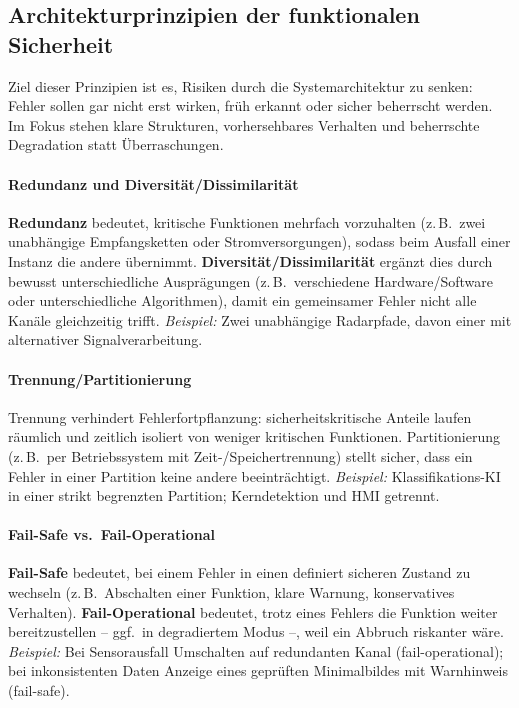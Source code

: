 \subsection{Architekturprinzipien der funktionalen Sicherheit}
Ziel dieser Prinzipien ist es, Risiken durch die Systemarchitektur zu senken: Fehler sollen gar nicht erst wirken, früh erkannt oder sicher beherrscht werden. Im Fokus stehen klare Strukturen, vorhersehbares Verhalten und beherrschte Degradation statt Überraschungen.

\paragraph{Redundanz und Diversität/Dissimilarität}
\textbf{Redundanz} bedeutet, kritische Funktionen mehrfach vorzuhalten (z.\,B.\ zwei unabhängige Empfangsketten oder Stromversorgungen), sodass beim Ausfall einer Instanz die andere übernimmt.
\textbf{Diversität/Dissimilarität} ergänzt dies durch bewusst unterschiedliche Ausprägungen (z.\,B.\ verschiedene Hardware/Software oder unterschiedliche Algorithmen), damit ein gemeinsamer Fehler nicht alle Kanäle gleichzeitig trifft.
\emph{Beispiel:} Zwei unabhängige Radarpfade, davon einer mit alternativer Signalverarbeitung.

\paragraph{Trennung/Partitionierung}
Trennung verhindert Fehlerfortpflanzung: sicherheitskritische Anteile laufen räumlich und zeitlich isoliert von weniger kritischen Funktionen. Partitionierung (z.\,B.\ per Betriebssystem mit Zeit-/Speichertrennung) stellt sicher, dass ein Fehler in einer Partition keine andere beeinträchtigt.
\emph{Beispiel:} Klassifikations-KI in einer strikt begrenzten Partition; Kerndetektion und HMI getrennt.

\paragraph{Fail-Safe vs.\ Fail-Operational}
\textbf{Fail-Safe} bedeutet, bei einem Fehler in einen definiert sicheren Zustand zu wechseln (z.\,B.\ Abschalten einer Funktion, klare Warnung, konservatives Verhalten).
\textbf{Fail-Operational} bedeutet, trotz eines Fehlers die Funktion weiter bereitzustellen – ggf.\ in degradiertem Modus –, weil ein Abbruch riskanter wäre.
\emph{Beispiel:} Bei Sensorausfall Umschalten auf redundanten Kanal (fail-operational); bei inkonsistenten Daten Anzeige eines geprüften Minimalbildes mit Warnhinweis (fail-safe).

